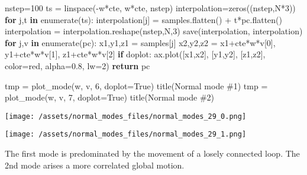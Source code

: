 \documentclass[
]{article}
\newenvironment{Shaded}{}{}
\newcommand{\BuiltInTok}[1]{\textcolor[rgb]{0.00,0.50,0.00}{#1}}
\newcommand{\ControlFlowTok}[1]{\textcolor[rgb]{0.00,0.44,0.13}{\textbf{#1}}}
\newcommand{\DecValTok}[1]{\textcolor[rgb]{0.25,0.63,0.44}{#1}}
\newcommand{\FloatTok}[1]{\textcolor[rgb]{0.25,0.63,0.44}{#1}}
\newcommand{\KeywordTok}[1]{\textcolor[rgb]{0.00,0.44,0.13}{\textbf{#1}}}
\newcommand{\NormalTok}[1]{#1}
\newcommand{\OperatorTok}[1]{\textcolor[rgb]{0.40,0.40,0.40}{#1}}
\newcommand{\StringTok}[1]{\textcolor[rgb]{0.25,0.44,0.63}{#1}}
\newcommand{\VariableTok}[1]{\textcolor[rgb]{0.10,0.09,0.49}{#1}}
\begin{document}
\begin{Shaded}
\begin{Highlighting}[]
\NormalTok{    nstep}\OperatorTok{=}\DecValTok{100}
\NormalTok{    ts }\OperatorTok{=}\NormalTok{ linspace(}\OperatorTok{{-}}\NormalTok{w}\OperatorTok{*}\NormalTok{cte, w}\OperatorTok{*}\NormalTok{cte, nstep)}
\NormalTok{    interpolation}\OperatorTok{=}\NormalTok{zeros((nstep,N}\OperatorTok{*}\DecValTok{3}\NormalTok{))}
    \ControlFlowTok{for}\NormalTok{ j,t }\KeywordTok{in} \BuiltInTok{enumerate}\NormalTok{(ts):}
\NormalTok{        interpolation[j] }\OperatorTok{=}\NormalTok{ samples.flatten() }\OperatorTok{+}\NormalTok{ t}\OperatorTok{*}\NormalTok{pc.flatten()}
\NormalTok{    interpolation }\OperatorTok{=}\NormalTok{ interpolation.reshape(nstep,N,}\DecValTok{3}\NormalTok{)}
\NormalTok{    save(}\StringTok{\textquotesingle{}interpolation\textquotesingle{}}\NormalTok{, interpolation)}
    \ControlFlowTok{for}\NormalTok{ j,v }\KeywordTok{in} \BuiltInTok{enumerate}\NormalTok{(pc):}
\NormalTok{        x1,y1,z1 }\OperatorTok{=}\NormalTok{ samples[j]}
\NormalTok{        x2,y2,z2 }\OperatorTok{=}\NormalTok{ x1}\OperatorTok{+}\NormalTok{cte}\OperatorTok{*}\NormalTok{w}\OperatorTok{*}\NormalTok{v[}\DecValTok{0}\NormalTok{], y1}\OperatorTok{+}\NormalTok{cte}\OperatorTok{*}\NormalTok{w}\OperatorTok{*}\NormalTok{v[}\DecValTok{1}\NormalTok{], z1}\OperatorTok{+}\NormalTok{cte}\OperatorTok{*}\NormalTok{w}\OperatorTok{*}\NormalTok{v[}\DecValTok{2}\NormalTok{]}
        \ControlFlowTok{if}\NormalTok{ doplot:}
\NormalTok{            ax.plot([x1,x2], [y1,y2], [z1,z2], color}\OperatorTok{=}\StringTok{\textquotesingle{}red\textquotesingle{}}\NormalTok{, alpha}\OperatorTok{=}\FloatTok{0.8}\NormalTok{, lw}\OperatorTok{=}\DecValTok{2}\NormalTok{)}
    \ControlFlowTok{return}\NormalTok{ pc}


\NormalTok{tmp }\OperatorTok{=}\NormalTok{ plot\_mode(w, v, }\DecValTok{6}\NormalTok{, doplot}\OperatorTok{=}\VariableTok{True}\NormalTok{)}
\NormalTok{title(}\StringTok{\textquotesingle{}Normal mode \#1\textquotesingle{}}\NormalTok{)}
\NormalTok{tmp }\OperatorTok{=}\NormalTok{ plot\_mode(w, v, }\DecValTok{7}\NormalTok{, doplot}\OperatorTok{=}\VariableTok{True}\NormalTok{)}
\NormalTok{title(}\StringTok{\textquotesingle{}Normal mode \#2\textquotesingle{}}\NormalTok{)}
\end{Highlighting}
\end{Shaded}

\texttt{[image: /assets/normal\_modes\_files/normal\_modes\_29\_0.png]}

\texttt{[image: /assets/normal\_modes\_files/normal\_modes\_29\_1.png]}

The first mode is predominated by the movement of a losely connected
loop. The 2nd mode arises a more correlated global motion.
\end{document}

